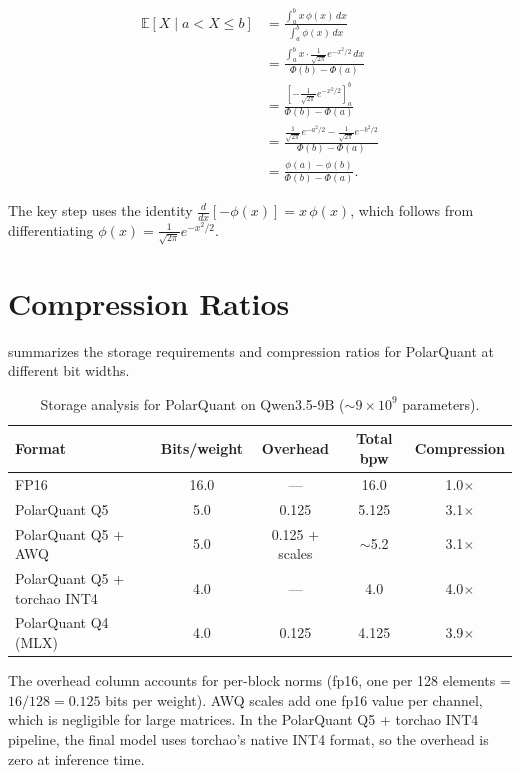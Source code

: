 \documentclass[10pt,twocolumn]{article}
\newcommand{\E}{\mathbb{E}}
\begin{document}
\begin{align}
  \E[X \mid a < X \leq b]
  &= \frac{\int_a^b x \, \phi(x) \, dx}{\int_a^b \phi(x) \, dx} \nonumber \\
  &= \frac{\int_a^b x \cdot \frac{1}{\sqrt{2\pi}} e^{-x^2/2} \, dx}{\Phi(b) - \Phi(a)} \nonumber \\
  &= \frac{\left[-\frac{1}{\sqrt{2\pi}} e^{-x^2/2}\right]_a^b}{\Phi(b) - \Phi(a)} \nonumber \\
  &= \frac{\frac{1}{\sqrt{2\pi}} e^{-a^2/2} - \frac{1}{\sqrt{2\pi}} e^{-b^2/2}}{\Phi(b) - \Phi(a)} \nonumber \\
  &= \frac{\phi(a) - \phi(b)}{\Phi(b) - \Phi(a)}.
  \label{eq:derivation}
\end{align}

The key step uses the identity $\frac{d}{dx}\left[-\phi(x)\right] = x \, \phi(x)$, which follows from differentiating $\phi(x) = \frac{1}{\sqrt{2\pi}} e^{-x^2/2}$.

\section{Compression Ratios}
\label{app:compression}

 summarizes the storage requirements and compression ratios for PolarQuant at different bit widths.

\begin{table}[h]
\centering
\caption{Storage analysis for PolarQuant on Qwen3.5-9B (${\sim}9 \times 10^9$ parameters).}
\label{tab:compression}
\small
\begin{tabular}{@{}lcccc@{}}
\toprule
\textbf{Format} & \textbf{Bits/weight} & \textbf{Overhead} & \textbf{Total bpw} & \textbf{Compression} \\
\midrule
FP16 & 16.0 & --- & 16.0 & 1.0$\times$ \\
PolarQuant Q5 & 5.0 & 0.125 & 5.125 & 3.1$\times$ \\
PolarQuant Q5 + AWQ & 5.0 & 0.125 + scales & ${\sim}$5.2 & 3.1$\times$ \\
PolarQuant Q5 + torchao INT4 & 4.0 & --- & 4.0 & 4.0$\times$ \\
PolarQuant Q4 (MLX) & 4.0 & 0.125 & 4.125 & 3.9$\times$ \\
\bottomrule
\end{tabular}
\end{table}

The overhead column accounts for per-block norms (fp16, one per 128 elements = $16/128 = 0.125$ bits per weight). AWQ scales add one fp16 value per channel, which is negligible for large matrices. In the PolarQuant Q5 + torchao INT4 pipeline, the final model uses torchao's native INT4 format, so the overhead is zero at inference time.
\end{document}
